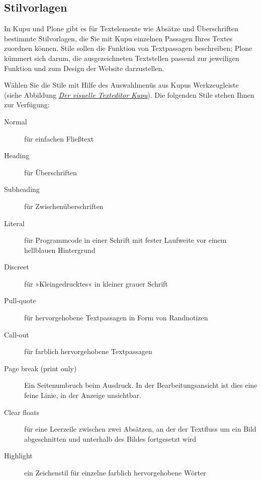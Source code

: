 \documentclass[a4paper,12pt,ngerman]{manual}
\begin{document}
\subsection{Stilvorlagen}

In Kupu und Plone gibt es für Textelemente wie Absätze und Überschriften
bestimmte Stilvorlagen, die Sie mit Kupu einzelnen Passagen Ihres Textes
zuordnen können. Stile sollen die Funktion von Textpassagen beschreiben; Plone
kümmert sich darum, die ausgezeichneten Textstellen passend zur jeweiligen
Funktion und zum Design der Website darzustellen.

Wählen Sie die Stile mit Hilfe des Auswahlmenüs aus Kupus Werkzeugleiste
(siehe Abbildung \hyperlink{fig-kupu}{\emph{Der visuelle Texteditor Kupu}}). Die folgenden Stile stehen Ihnen zur
Verfügung:
\begin{description}
\item[Normal] \leavevmode
für einfachen Fließtext

\item[Heading] \leavevmode
für Überschriften

\item[Subheading] \leavevmode
für Zwischenüberschriften

\item[Literal] \leavevmode
für Programmcode in einer Schrift mit fester Laufweite vor
einem hellblauen Hintergrund

\item[Discreet] \leavevmode
für »Kleingedrucktes« in kleiner grauer Schrift

\item[Pull-quote] \leavevmode
für hervorgehobene Textpassagen in Form von Randnotizen

\item[Call-out] \leavevmode
für farblich hervorgehobene Textpassagen

\item[Page break (print only)] \leavevmode
Ein Seitenumbruch beim Ausdruck. In der
Bearbeitungsansicht ist dies eine feine Linie, in der Anzeige unsichtbar.

\item[Clear floats] \leavevmode
für eine Leerzeile zwischen zwei Absätzen, an der der
Textfluss um ein Bild abgeschnitten und unterhalb des Bildes fortgesetzt
wird

\item[Highlight] \leavevmode
ein Zeichenstil für einzelne farblich hervorgehobene Wörter

\end{description}
\end{document}
